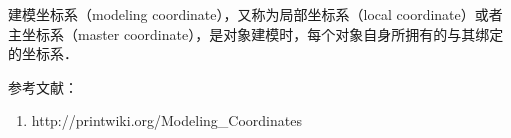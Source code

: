 
建模坐标系（modeling coordinate），又称为局部坐标系（local coordinate）或者主坐标系（master coordinate），是对象建模时，每个对象自身所拥有的与其绑定的坐标系．





参考文献：
\begin{enumerate}
\item http://printwiki.org/Modeling_Coordinates
\end{enumerate}